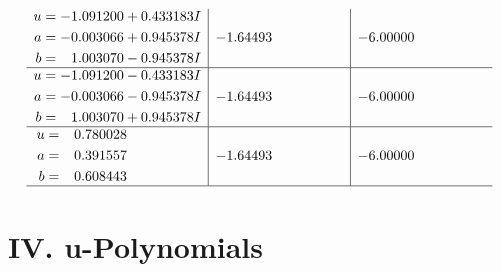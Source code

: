 \documentclass[1p]{elsarticle_modified}
\theoremstyle{definition}
\begin{document}
$$\begin{array}{c|c|c}
\begin{aligned}
u &= -1.091200 + 0.433183 I \\
a &= -0.003066 + 0.945378 I \\
b &= \phantom{-}1.003070 - 0.945378 I\end{aligned}
 & -1.64493\phantom{ +0.000000I} & -6.00000\phantom{ +0.000000I} \\ \hline\begin{aligned}
u &= -1.091200 - 0.433183 I \\
a &= -0.003066 - 0.945378 I \\
b &= \phantom{-}1.003070 + 0.945378 I\end{aligned}
 & -1.64493\phantom{ +0.000000I} & -6.00000\phantom{ +0.000000I} \\ \hline\begin{aligned}
u &= \phantom{-}0.780028\phantom{ +0.000000I} \\
a &= \phantom{-}0.391557\phantom{ +0.000000I} \\
b &= \phantom{-}0.608443\phantom{ +0.000000I}\end{aligned}
 & -1.64493\phantom{ +0.000000I} & -6.00000\phantom{ +0.000000I}\\
 \hline 
 \end{array}$$\newpage
\newpage\renewcommand{\arraystretch}{1}
\centering \section*{ IV. u-Polynomials}
\end{document}
